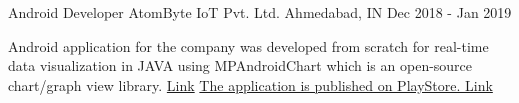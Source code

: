 \begin{cventries}
  \cventry
     {Android Developer} %
    {AtomByte IoT Pvt. Ltd.} %
    {Ahmedabad, IN} %
    {Dec 2018 - Jan 2019} %
    {
      \begin{cvitems} %
        \item {Android application for the company was developed from scratch for real-time data visualization in JAVA using MPAndroidChart which is an open-source chart/graph view library. \href{https://drive.google.com/open?id=1Wf_X23r4PNkoN9Pf-WYacyoW3gCFnh-O}{Link} \href{https://play.google.com/store/apps/details?id=app.ruchitesh.atombyteapp&hl=en}{ The application is published on PlayStore. Link}
        }
      \end{cvitems}
    }




\end{cventries}
